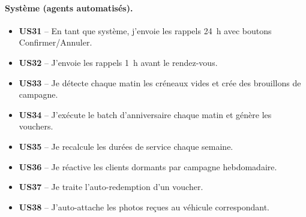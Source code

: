 \paragraph{Système (agents automatisés).}
\begin{itemize}[leftmargin=1.5em,itemsep=2pt,topsep=2pt]
  \item \textbf{US31} -- En tant que système, j'envoie les rappels 24~h avec boutons Confirmer/Annuler.
  \item \textbf{US32} -- J'envoie les rappels 1~h avant le rendez-vous.
  \item \textbf{US33} -- Je détecte chaque matin les créneaux vides et crée des brouillons de campagne.
  \item \textbf{US34} -- J'exécute le batch d'anniversaire chaque matin et génère les vouchers.
  \item \textbf{US35} -- Je recalcule les durées de service chaque semaine.
  \item \textbf{US36} -- Je réactive les clients dormants par campagne hebdomadaire.
  \item \textbf{US37} -- Je traite l'auto-redemption d'un voucher.
  \item \textbf{US38} -- J'auto-attache les photos reçues au véhicule correspondant.
\end{itemize}

